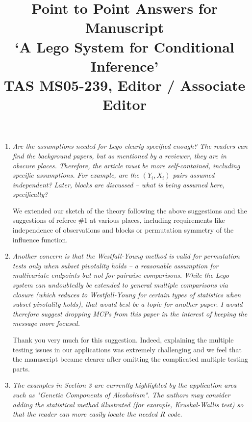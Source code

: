\documentclass[11pt]{article}
\begin{document}
\title{Point to Point Answers for Manuscript \\
`A Lego System for Conditional Inference' \\
TAS MS05-239, Editor / Associate Editor}
\author{}
\maketitle

\begin{enumerate}

\item \textsl{Are the assumptions needed for Lego clearly specified enough? 
              The readers can find the background papers, but as mentioned by a reviewer, 
              they are in obscure places.  Therefore, the article must be more self-contained, 
              including specific assumptions.  For example, are the $(Y_i, X_i)$ pairs assumed independent?  
              Later, blocks are discussed -- what is being assumed here, specifically?}

We extended our sketch of the theory following the above suggestions and the
suggestions of referee \#1 at various places, including requirements like
independence of observations and blocks or permutation symmetry of the
influence function. 

\item \textsl{Another concern is that the Westfall-Young method is valid for permutation tests 
              only when subset pivotality holds -- a reasonable assumption for multivariate 
              endpoints but not for pairwise comparisons.  While the Lego system can undoubtedly be 
              extended to general multiple comparisons via closure (which reduces to Westfall-Young 
              for certain types of statistics when subset pivotality holds), that would best be a 
              topic for another paper.  I would therefore suggest dropping MCPs from this paper 
              in the interest of keeping the message more focused.}

Thank you very much for this suggestion. Indeed, explaining the multiple
testing issues in our applications was extremely challenging and we feel
that the manuscript became clearer after omitting the complicated multiple
testing parts. 

\item \textsl{The examples in Section 3 are currently highlighted by the application area 
              such as "Genetic Components of Alcoholism". The authors may consider adding the 
              statistical method illustrated (for example, Kruskal-Wallis test) so that the 
              reader can more easily locate the needed R code.}


\end{enumerate}
\end{document}
